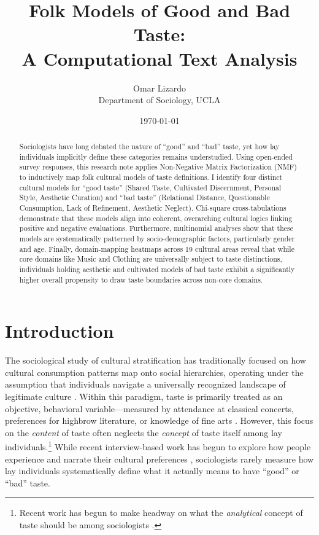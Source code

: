 \documentclass[12pt,letterpaper]{article}
\title{Folk Models of Good and Bad Taste: \\ A Computational Text Analysis}
\author{Omar Lizardo \\ Department of Sociology, UCLA}
\date{\today}
\begin{document}
\maketitle

\begin{abstract}

Sociologists have long debated the nature of ``good'' and ``bad'' taste, yet how lay individuals implicitly define these categories remains understudied. Using open-ended survey responses, this research note applies Non-Negative Matrix Factorization (NMF) to inductively map folk cultural models of taste definitions. I identify four distinct cultural models for ``good taste'' (Shared Taste, Cultivated Discernment, Personal Style, Aesthetic Curation) and ``bad taste'' (Relational Distance, Questionable Consumption, Lack of Refinement, Aesthetic Neglect). Chi-square cross-tabulations demonstrate that these models align into coherent, overarching cultural logics linking positive and negative evaluations. Furthermore, multinomial analyses show that these models are systematically patterned by socio-demographic factors, particularly gender and age. Finally, domain-mapping heatmaps across 19 cultural areas reveal that while core domains like Music and Clothing are universally subject to taste distinctions, individuals holding aesthetic and cultivated models of bad taste exhibit a significantly higher overall propensity to draw taste boundaries across non-core domains.
\end{abstract}

\newpage
\section{Introduction}

The sociological study of cultural stratification has traditionally focused on how cultural consumption patterns map onto social hierarchies, operating under the assumption that individuals navigate a universally recognized landscape of legitimate culture \citep{bourdieu1984distinction-835}. Within this paradigm, taste is primarily treated as an objective, behavioral variable—measured by attendance at classical concerts, preferences for highbrow literature, or knowledge of fine arts \citep{dimaggio2004arts-de9}. However, this focus on the \textit{content} of taste often neglects the \textit{concept} of taste itself among lay individuals.\footnote{Recent work has begun to make headway on what the \textit{analytical} concept of taste should be among sociologists \citep{xiangyu2026tastes-710, baumann2026graded-610}.} While recent interview-based work has begun to explore how people experience and narrate their cultural preferences \citep{haak2019struggling-502, jarness2017im-001}, sociologists rarely measure how lay individuals systematically define what it actually means to have ``good'' or ``bad'' taste. 
\end{document}
